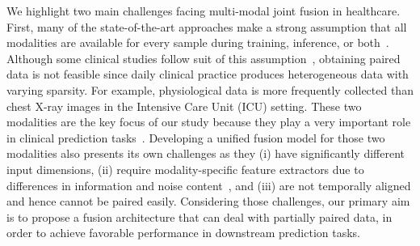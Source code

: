 \documentclass[pmlr]{jmlr}
\begin{document}
We highlight two main challenges facing multi-modal joint fusion in healthcare. First, many of the state-of-the-art approaches make a strong assumption that all modalities are available for every sample during training, inference, or both~\citep{daft}. Although some clinical studies follow suit of this assumption~\citep{Huang2020_survey}, obtaining paired data is not feasible since daily clinical practice produces heterogeneous data with varying sparsity. For example, physiological data is more frequently collected than chest X-ray images in the Intensive Care Unit (ICU) setting. These two modalities are the key focus of our study because they play a very important role in clinical prediction tasks~\citep{benchhmark, Lohan2019}. Developing a unified fusion model for those two modalities also presents its own challenges as they (i) have significantly different input dimensions, (ii) require modality-specific feature extractors due to differences in information and noise content~\citep{nagrani2021attention}, and (iii) are not temporally aligned and hence cannot be paired easily. Considering those challenges, our primary aim is to propose a fusion architecture that can deal with partially paired data, in order to achieve favorable performance in downstream prediction tasks.
\end{document}
